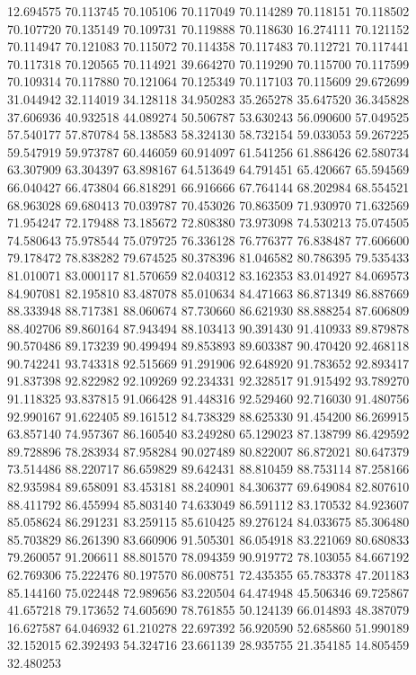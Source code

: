 12.694575
70.113745
70.105106
70.117049
70.114289
70.118151
70.118502
70.107720
70.135149
70.109731
70.119888
70.118630
16.274111
70.121152
70.114947
70.121083
70.115072
70.114358
70.117483
70.112721
70.117441
70.117318
70.120565
70.114921
39.664270
70.119290
70.115700
70.117599
70.109314
70.117880
70.121064
70.125349
70.117103
70.115609
29.672699
31.044942
32.114019
34.128118
34.950283
35.265278
35.647520
36.345828
37.606936
40.932518
44.089274
50.506787
53.630243
56.090600
57.049525
57.540177
57.870784
58.138583
58.324130
58.732154
59.033053
59.267225
59.547919
59.973787
60.446059
60.914097
61.541256
61.886426
62.580734
63.307909
63.304397
63.898167
64.513649
64.791451
65.420667
65.594569
66.040427
66.473804
66.818291
66.916666
67.764144
68.202984
68.554521
68.963028
69.680413
70.039787
70.453026
70.863509
71.930970
71.632569
71.954247
72.179488
73.185672
72.808380
73.973098
74.530213
75.074505
74.580643
75.978544
75.079725
76.336128
76.776377
76.838487
77.606600
79.178472
78.838282
79.674525
80.378396
81.046582
80.786395
79.535433
81.010071
83.000117
81.570659
82.040312
83.162353
83.014927
84.069573
84.907081
82.195810
83.487078
85.010634
84.471663
86.871349
86.887669
88.333948
88.717381
88.060674
87.730660
86.621930
88.888254
87.606809
88.402706
89.860164
87.943494
88.103413
90.391430
91.410933
89.879878
90.570486
89.173239
90.499494
89.853893
89.603387
90.470420
92.468118
90.742241
93.743318
92.515669
91.291906
92.648920
91.783652
92.893417
91.837398
92.822982
92.109269
92.234331
92.328517
91.915492
93.789270
91.118325
93.837815
91.066428
91.448316
92.529460
92.716030
91.480756
92.990167
91.622405
89.161512
84.738329
88.625330
91.454200
86.269915
63.857140
74.957367
86.160540
83.249280
65.129023
87.138799
86.429592
89.728896
78.283934
87.958284
90.027489
80.822007
86.872021
80.647379
73.514486
88.220717
86.659829
89.642431
88.810459
88.753114
87.258166
82.935984
89.658091
83.453181
88.240901
84.306377
69.649084
82.807610
88.411792
86.455994
85.803140
74.633049
86.591112
83.170532
84.923607
85.058624
86.291231
83.259115
85.610425
89.276124
84.033675
85.306480
85.703829
86.261390
83.660906
91.505301
86.054918
83.221069
80.680833
79.260057
91.206611
88.801570
78.094359
90.919772
78.103055
84.667192
62.769306
75.222476
80.197570
86.008751
72.435355
65.783378
47.201183
85.144160
75.022448
72.989656
83.220504
64.474948
45.506346
69.725867
41.657218
79.173652
74.605690
78.761855
50.124139
66.014893
48.387079
16.627587
64.046932
61.210278
22.697392
56.920590
52.685860
51.990189
32.152015
62.392493
54.324716
23.661139
28.935755
21.354185
14.805459
32.480253
